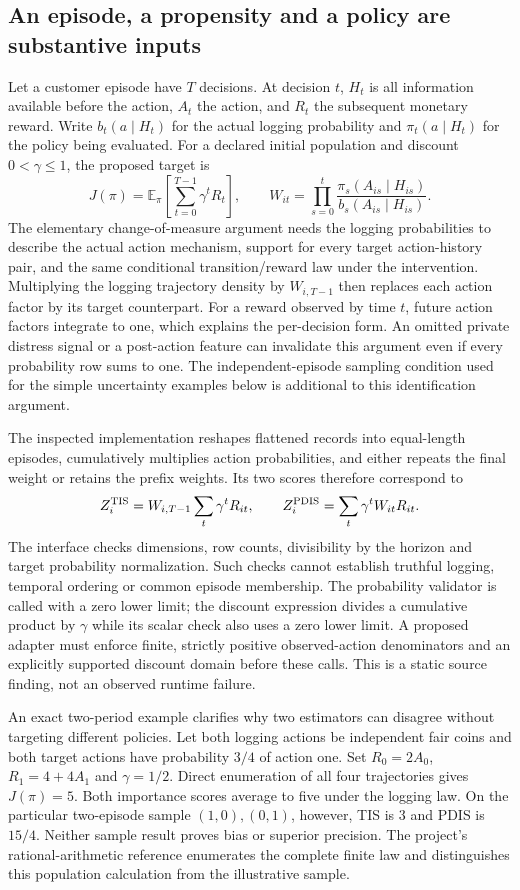 \subsection{An episode, a propensity and a policy are substantive inputs}
\label{exec23:scope-rl-target}
Let a customer episode have $T$ decisions. At decision $t$, $H_t$ is all
information available before the action, $A_t$ the action, and $R_t$ the
subsequent monetary reward. Write $b_t(a\mid H_t)$ for the actual logging
probability and $\pi_t(a\mid H_t)$ for the policy being evaluated. For a declared
initial population and discount $0<\gamma\leq1$, the proposed target is
\[
 J(\pi)=\mathbb E_\pi\!\left[\sum_{t=0}^{T-1}\gamma^tR_t\right],
 \qquad
 W_{it}=\prod_{s=0}^{t}
 \frac{\pi_s(A_{is}\mid H_{is})}{b_s(A_{is}\mid H_{is})}.
\]
The elementary change-of-measure argument needs the logging probabilities to
describe the actual action mechanism, support for every target action-history
pair, and the same conditional transition/reward law under the intervention.
Multiplying the logging trajectory density by $W_{i,T-1}$ then replaces each
action factor by its target counterpart. For a reward observed by time $t$,
future action factors integrate to one, which explains the per-decision form.
An omitted private distress signal or a post-action feature can invalidate this
argument even if every probability row sums to one. The independent-episode
sampling condition used for the simple uncertainty examples below is additional
to this identification argument.

The inspected implementation reshapes flattened records into equal-length
episodes, cumulatively multiplies action probabilities, and either repeats the
final weight or retains the prefix weights. Its two scores therefore correspond
to
\[
 Z_i^{\rm TIS}=W_{i,T-1}\sum_t\gamma^tR_{it},
 \qquad Z_i^{\rm PDIS}=\sum_t\gamma^tW_{it}R_{it}.
\]
The interface checks dimensions, row counts, divisibility by the horizon and
target probability normalization. Such checks cannot establish truthful
logging, temporal ordering or common episode membership. The probability
validator is called with a zero lower limit; the discount expression divides a
cumulative product by $\gamma$ while its scalar check also uses a zero lower
limit. A proposed adapter must enforce finite, strictly positive observed-action
denominators and an explicitly supported discount domain before these calls.
This is a static source finding, not an observed runtime failure.
\cite{exec23_scope_rl_sources}

An exact two-period example clarifies why two estimators can disagree without
targeting different policies. Let both logging actions be independent fair
coins and both target actions have probability $3/4$ of action one. Set
$R_0=2A_0$, $R_1=4+4A_1$ and $\gamma=1/2$. Direct enumeration of all four
trajectories gives $J(\pi)=5$. Both importance scores average to five under the
logging law. On the particular two-episode sample $(1,0),(0,1)$, however, TIS is
$3$ and PDIS is $15/4$. Neither sample result proves bias or superior precision.
The project's rational-arithmetic reference enumerates the complete finite law
and distinguishes this population calculation from the illustrative sample.
\cite{exec23_scope_rl_reference}

